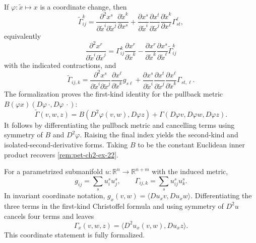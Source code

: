 \begin{remark}
  \label{rem:pet-ch2-ex-21}
  \leanok
  If $\varphi:\tilde x\mapsto x$ is a coordinate
  change, then
  \[
    \widetilde\Gamma^k_{ij}
      =\frac{\partial^2x^s}
              {\partial\tilde x^i\partial\tilde x^j}
         \frac{\partial\tilde x^k}{\partial x^s}
       +\frac{\partial x^s}{\partial\tilde x^i}
        \frac{\partial x^t}{\partial\tilde x^j}
        \frac{\partial\tilde x^k}{\partial x^\ell}
        \Gamma^\ell_{st},
  \]
  equivalently
  \[
    \frac{\partial^2x^r}
         {\partial\tilde x^i\partial\tilde x^j}
      =\Gamma^k_{ij}\frac{\partial x^r}{\partial\tilde x^k}
       -\frac{\partial x^r}{\partial\tilde x^k}
        \frac{\partial x^s}{\partial\tilde x^\ell}
        \widetilde\Gamma^k_{ij}
  \]
  with the indicated contractions, and
  \[
    \widetilde\Gamma_{ij,k}
      =\frac{\partial^2x^s}
              {\partial\tilde x^i\partial\tilde x^j}
         \frac{\partial x^\ell}{\partial\tilde x^k}g_{s\ell}
       +\frac{\partial x^s}{\partial\tilde x^i}
        \frac{\partial x^t}{\partial\tilde x^j}
        \frac{\partial x^\ell}{\partial\tilde x^k}\Gamma_{st,\ell}.
  \]
  \sketch
  The formalization proves the first-kind identity for the pullback metric
  $B(\varphi x)(D\varphi\,\cdot,D\varphi\,\cdot)$:
  \[
    \widetilde\Gamma(v,w,z)
      =B(D^2\varphi(v,w),D\varphi z)
       +\Gamma(D\varphi v,D\varphi w,D\varphi z).
  \]
  It follows by differentiating the pullback metric and cancelling terms using
  symmetry of $B$ and $D^2\varphi$. Raising the final index yields the
  second-kind and isolated-second-derivative forms. Taking $B$ to be the
  constant Euclidean inner product recovers \cref{rem:pet-ch2-ex-22}.
\end{remark}

\begin{remark}
  \label{rem:pet-ch2-ex-22}
  \leanok
  For a parametrized submanifold
  $u:\mathbb{R}^n\to\mathbb{R}^{n+m}$ with the induced metric,
  \[
    g_{ij}=\sum_su^s_i u^s_j,\qquad
    \Gamma_{ij,k}=\sum_su^s_{ij}u^s_k.
  \]
  \sketch
  In invariant coordinate notation,
  $g_x(v,w)=\langle Du_xv,Du_xw\rangle$. Differentiating the three terms in
  the first-kind Christoffel formula and using symmetry of $D^2u$ cancels four
  terms and leaves
  \[
    \Gamma_x(v,w,z)=\langle D^2u_x(v,w),Du_xz\rangle.
  \]
  This coordinate statement is fully formalized.
\end{remark}

